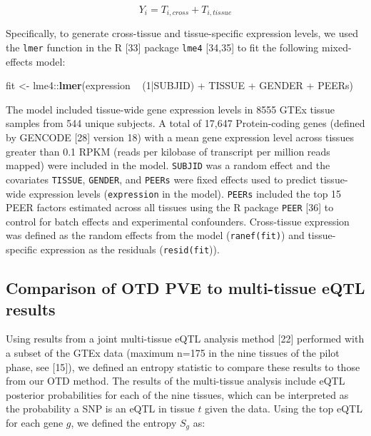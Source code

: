 \documentclass[]{article}
\newenvironment{Shaded}{\begin{snugshade}}{\end{snugshade}}
\newcommand{\KeywordTok}[1]{\textcolor[rgb]{0.13,0.29,0.53}{\textbf{{#1}}}}
\newcommand{\DecValTok}[1]{\textcolor[rgb]{0.00,0.00,0.81}{{#1}}}
\newcommand{\StringTok}[1]{\textcolor[rgb]{0.31,0.60,0.02}{{#1}}}
\newcommand{\NormalTok}[1]{{#1}}
\begin{document}
\[ Y_i = T_{i,cross} + T_{i,tissue} \]

Specifically, to generate cross-tissue and tissue-specific expression
levels, we used the \texttt{lmer} function in the R {[}33{]} package
\texttt{lme4} {[}34,35{]} to fit the following mixed-effects model:

\begin{Shaded}
\begin{Highlighting}[]
\NormalTok{fit <-}\StringTok{ }\NormalTok{lme4::}\KeywordTok{lmer}\NormalTok{(expression ~}\StringTok{ }\NormalTok{(}\DecValTok{1}\NormalTok{|SUBJID) +}\StringTok{ }\NormalTok{TISSUE +}\StringTok{ }\NormalTok{GENDER +}\StringTok{ }\NormalTok{PEERs)}
\end{Highlighting}
\end{Shaded}

The model included tissue-wide gene expression levels in 8555 GTEx
tissue samples from 544 unique subjects. A total of 17,647
Protein-coding genes (defined by GENCODE {[}28{]} version 18) with a
mean gene expression level across tissues greater than 0.1 RPKM (reads
per kilobase of transcript per million reads mapped) were included in
the model. \texttt{SUBJID} was a random effect and the covariates
\texttt{TISSUE}, \texttt{GENDER}, and \texttt{PEERs} were fixed effects
used to predict tissue-wide expression levels (\texttt{expression} in
the model). \texttt{PEERs} included the top 15 PEER factors estimated
across all tissues using the R package \texttt{PEER} {[}36{]} to control
for batch effects and experimental confounders. Cross-tissue expression
was defined as the random effects from the model (\texttt{ranef(fit)})
and tissue-specific expression as the residuals (\texttt{resid(fit})).

\subsection{Comparison of OTD PVE to multi-tissue eQTL
results}\label{comparison-of-otd-pve-to-multi-tissue-eqtl-results}

Using results from a joint multi-tissue eQTL analysis method {[}22{]}
performed with a subset of the GTEx data (maximum n=175 in the nine
tissues of the pilot phase, see {[}15{]}), we defined an entropy
statistic to compare these results to those from our OTD method. The
results of the multi-tissue analysis include eQTL posterior
probabilities for each of the nine tissues, which can be interpreted as
the probability a SNP is an eQTL in tissue \(t\) given the data. Using
the top eQTL for each gene \(g\), we defined the entropy \(S_g\) as:
\end{document}

